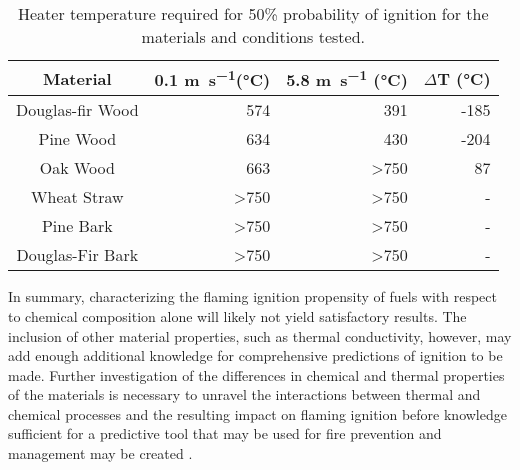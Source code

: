     \begin{table*}[hpbt]
        \caption{Heater temperature required for 50\% probability of ignition for the materials and conditions tested.}
        \centering
        \begin{tabular}{crrr}
            Material & 0.1 \si{\meter\per\second}(\si{\celsius}) & 5.8 \si{\meter\per\second} (\si{\celsius}) & $\Delta$T (\si{\celsius})\\
            \hline
            Douglas-fir Wood & 574  & 391 & -185 \\
            Pine Wood        & 634  & 430 & -204\\
            Oak Wood         & 663  & \textgreater750 & 87\\
            Wheat Straw      & \textgreater750 & \textgreater750 & -\\
            Pine Bark        & \textgreater750 & \textgreater750 & -\\
            Douglas-Fir Bark & \textgreater750 & \textgreater750 & -
        \end{tabular}
        \label{tab:composition50temp}
    \end{table*}
    
    In summary, characterizing the flaming ignition propensity of fuels with respect to chemical composition alone will likely not yield satisfactory results. The inclusion of other material properties, such as thermal conductivity, however, may add enough additional knowledge for comprehensive predictions of ignition to be made. Further investigation of the differences in chemical and thermal properties of the materials is necessary to unravel the interactions between thermal and chemical processes and the resulting impact on flaming ignition before knowledge sufficient for a predictive tool that may be used for fire prevention and management may be created
    \cite{MacLean1941}.
    

    
   